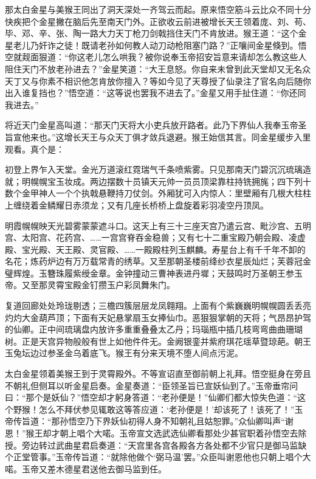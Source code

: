 \documentclass[12pt,UTF8]{ctexbook}
\begin{document}
那太白金星与美猴王同出了洞天深处一齐驾云而起。原来悟空筋斗云比众不同十分快疾把个金星撇在脑后先至南天门外。正欲收云前进被增长天王领着庞、刘、苟、毕、邓、辛、张、陶一路大力天丁枪刀剑戟挡住天门不肯放进。猴王道：“这个金星老儿乃奸诈之徒！既请老孙如何教人动刀动枪阻塞门路？”正嚷间金星倏到。悟空就觌面狠道：“你这老儿怎么哄我？被你说奉玉帝招安旨意来请却怎么教这些人阻住天门不放老孙进去？”金星笑道：“大王息怒。你自来未曾到此天堂却又无名众天丁又与你素不相识他怎肯放你擅入？等如今见了天尊授了仙录注了官名向后随你出入谁复挡也？”悟空道：“这等说也罢我不进去了。”金星又用手扯住道：“你还同我进去。”

将近天门金星高叫道：“那天门天将大小吏兵放开路者。此乃下界仙人我奉玉帝圣旨宣他来也。”这增长天王与众天丁俱才敛兵退避。猴王始信其言。同金星缓步入里观看。真个是：

初登上界乍入天堂。金光万道滚红霓瑞气千条喷紫雾。只见那南天门碧沉沉琉璃造就；明幌幌宝玉妆成。两边摆数十员镇天元帅一员员顶梁靠柱持铣拥旄；四下列十数个金甲神人一个个执戟悬鞭持刀仗剑。外厢犹可入内惊人：里壁厢有几根大柱柱上缠绕着金鳞耀日赤须龙；又有几座长桥桥上盘旋着彩羽凌空丹顶凤。

明霞幌幌映天光碧雾蒙蒙遮斗口。这天上有三十三座天宫乃遣云宫、毗沙宫、五明宫、太阳宫、花药宫、……一宫宫脊吞金稳兽；又有七十二重宝殿乃朝会殿、凌虚殿、宝光殿、天王殿、灵官殿、……一殿殿柱列玉麒麟。寿星台上有千千年不卸的名花；炼药炉边有万万载常青的绣草。又至那朝圣楼前绛纱衣星辰灿烂；芙蓉冠金璧辉煌。玉簪珠履紫绶金章。金钟撞动三曹神表进丹墀；天鼓鸣时万圣朝王参玉帝。又至那灵霄宝殿金钉攒玉户彩凤舞朱门。

复道回廊处处玲珑剔透；三檐四簇层层龙凤翱翔。上面有个紫巍巍明幌幌圆丢丢亮灼灼大金葫芦顶；下面有天妃悬掌扇玉女捧仙巾。恶狠狠掌朝的天将；气昂昂护驾的仙卿。正中间琉璃盘内放许多重重叠叠太乙丹；玛瑙瓶中插几枝弯弯曲曲珊瑚树。正是天宫异物般般有世上如他件件无。金阙银銮并紫府琪花瑶草暨琼葩。朝王玉兔坛边过参圣金乌着底飞。猴王有分来天境不堕人间点污泥。

太白金星领着美猴王到于灵霄殿外。不等宣诏直至御前朝上礼拜。悟空挺身在旁且不朝礼但侧耳以听金星启奏。金星奏道：“臣领圣旨已宣妖仙到了。”玉帝垂帘问曰：“那个是妖仙？”悟空却才躬身答道：“老孙便是！”仙卿们都大惊失色道：“这个野猴！怎么不拜伏参见辄敢这等答应道：‘老孙便是！’却该死了！该死了！”玉帝传旨道：“那孙悟空乃下界妖仙初得人身不知朝礼且姑恕罪。”众仙卿叫声“谢恩！”猴王却才朝上唱个大喏。玉帝宣文选武选仙卿看那处少甚官职着孙悟空去除授。旁边转过武曲星君启奏道：“天宫里各宫各殿各方各处都不少官只是御马监缺个正堂管事。”玉帝传旨道：“就除他做个‘弼马温’罢。”众臣叫谢恩他也只朝上唱个大喏。玉帝又差木德星君送他去御马监到任。
\end{document}
